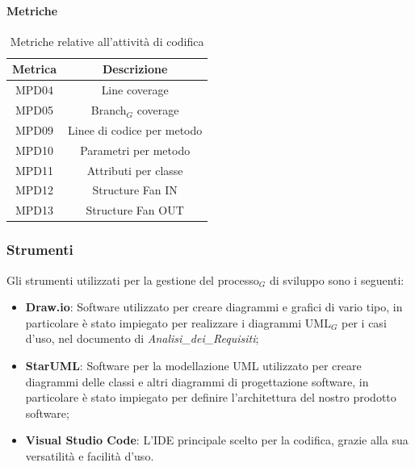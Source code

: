 \documentclass[10pt]{article}
\begin{document}
\begin{justify}
        \paragraph{Metriche}
        \begin{table}[H]
          \centering
          \begin{tabular}{|c|c|}
            \hline
            \textbf{Metrica} & \textbf{Descrizione} \\
            \hline
            MPD04 & Line coverage\\
            \hline
            MPD05 & Branch$_G$ coverage\\
            \hline
            MPD09 & Linee di codice per metodo\\
            \hline
            MPD10 & Parametri per metodo\\
            \hline
            MPD11 & Attributi per classe\\
            \hline
            MPD12 & Structure Fan IN\\
            \hline
            MPD13 & Structure Fan OUT\\
            \hline
          \end{tabular}
          \caption{Metriche relative all'attività di codifica}
        \end{table}

    \subsubsection{Strumenti}
    Gli strumenti utilizzati per la gestione del processo$_G$ di sviluppo sono i seguenti:
    \begin{itemize}
        \item \textbf{Draw.io}: Software utilizzato per creare diagrammi e grafici di vario tipo, in particolare è stato impiegato per realizzare i diagrammi UML$_G$ per i casi d'uso, nel documento di \textit{Analisi\_dei\_Requisiti};
        \item \textbf{StarUML}: Software per la modellazione UML utilizzato per creare diagrammi delle classi e altri diagrammi di progettazione software, in particolare è stato impiegato per definire l'architettura del nostro prodotto software;
        \item \textbf{Visual Studio Code}: L'IDE principale scelto per la codifica, grazie alla sua versatilità e facilità d'uso.
    \end{itemize}


\end{justify}
\end{document}
